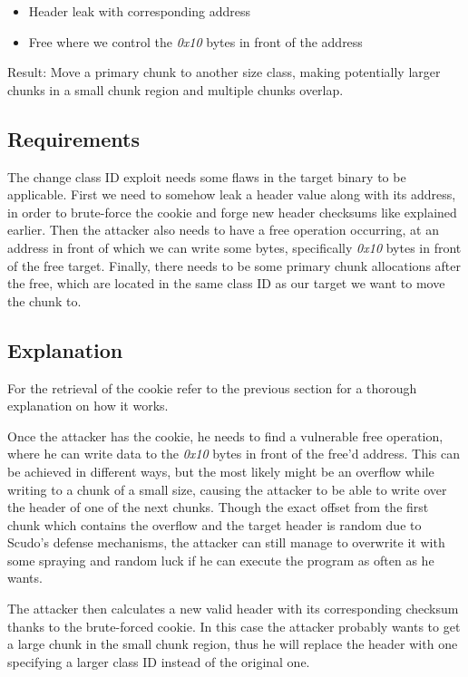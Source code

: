 \documentclass[a4paper,11pt,oneside]{report}
\begin{document}
\begin{itemize}
\item Header leak with corresponding address
\item Free where we control the \emph{0x10} bytes in front of the address
\end{itemize}

Result: Move a primary chunk to another size class, making potentially larger chunks in a
small chunk region and multiple chunks overlap.

\subsection{Requirements}

The change class ID exploit needs some flaws in the target binary to be applicable.  First
we need to somehow leak a header value along with its address, in order to brute-force the
cookie and forge new header checksums like explained earlier. Then the attacker also needs
to have a free operation occurring, at an address in front of which we can write some
bytes, specifically \emph{0x10} bytes in front of the free target. Finally, there needs to
be some primary chunk allocations after the free, which are located in the same class ID
as our target we want to move the chunk to.

\subsection{Explanation}

For the retrieval of the cookie refer to the previous section for a thorough explanation
on how it works.

Once the attacker has the cookie, he needs to find a vulnerable free operation, where he
can write data to the \emph{0x10} bytes in front of the free'd address. This can be
achieved in different ways, but the most likely might be an overflow while writing to a
chunk of a small size, causing the attacker to be able to write over the header of one of
the next chunks. Though the exact offset from the first chunk which contains the overflow
and the target header is random due to Scudo's defense mechanisms, the attacker can still
manage to overwrite it with some spraying and random luck if he can execute the program as
often as he wants.

The attacker then calculates a new valid header with its corresponding checksum thanks to
the brute-forced cookie. In this case the attacker probably wants to get a large chunk in
the small chunk region, thus he will replace the header with one specifying a larger class
ID instead of the original one.
\end{document}
